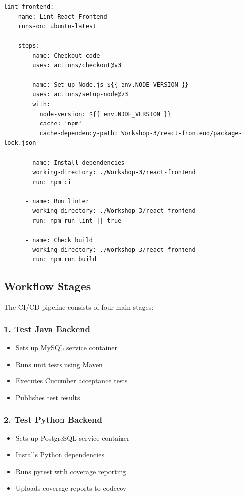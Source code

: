 \documentclass[12pt,a4paper]{article}
\begin{document}
\begin{lstlisting}[style=yaml, caption={GitHub Actions CI/CD Workflow}, label={lst:github-actions}]
  lint-frontend:
    name: Lint React Frontend
    runs-on: ubuntu-latest
    
    steps:
      - name: Checkout code
        uses: actions/checkout@v3

      - name: Set up Node.js ${{ env.NODE_VERSION }}
        uses: actions/setup-node@v3
        with:
          node-version: ${{ env.NODE_VERSION }}
          cache: 'npm'
          cache-dependency-path: Workshop-3/react-frontend/package-lock.json

      - name: Install dependencies
        working-directory: ./Workshop-3/react-frontend
        run: npm ci

      - name: Run linter
        working-directory: ./Workshop-3/react-frontend
        run: npm run lint || true

      - name: Check build
        working-directory: ./Workshop-3/react-frontend
        run: npm run build
\end{lstlisting}

\subsection{Workflow Stages}

The CI/CD pipeline consists of four main stages:

\subsubsection{1. Test Java Backend}
\begin{itemize}
    \item Sets up MySQL service container
    \item Runs unit tests using Maven
    \item Executes Cucumber acceptance tests
    \item Publishes test results
\end{itemize}

\subsubsection{2. Test Python Backend}
\begin{itemize}
    \item Sets up PostgreSQL service container
    \item Installs Python dependencies
    \item Runs pytest with coverage reporting
    \item Uploads coverage reports to codecov
\end{itemize}
\end{document}
